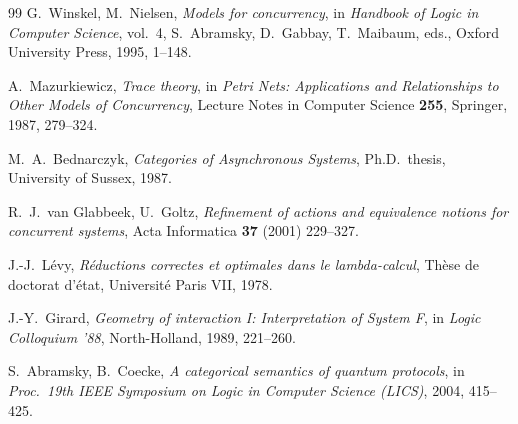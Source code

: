 \documentclass[11pt]{article}
\theoremstyle{definition}
\theoremstyle{plain}
\theoremstyle{remark}
\begin{document}
\begin{thebibliography}{99}
G.~Winskel, M.~Nielsen,
\emph{Models for concurrency},
in \textit{Handbook of Logic in Computer Science}, vol.~4,
S.~Abramsky, D.~Gabbay, T.~Maibaum, eds., Oxford University Press, 1995,
1--148.

A.~Mazurkiewicz,
\emph{Trace theory},
in \textit{Petri Nets: Applications and Relationships to Other Models of
Concurrency}, Lecture Notes in Computer Science \textbf{255},
Springer, 1987, 279--324.

M.~A.~Bednarczyk,
\emph{Categories of Asynchronous Systems},
Ph.D.\ thesis, University of Sussex, 1987.

R.~J.~van Glabbeek, U.~Goltz,
\emph{Refinement of actions and equivalence notions for concurrent
systems},
Acta Informatica \textbf{37} (2001) 229--327.

J.-J.~L\'evy,
\emph{R\'eductions correctes et optimales dans le lambda-calcul},
Th\`ese de doctorat d'\'etat, Universit\'e Paris VII, 1978.

J.-Y.~Girard,
\emph{Geometry of interaction I: Interpretation of System F},
in \textit{Logic Colloquium '88}, North-Holland, 1989, 221--260.

S.~Abramsky, B.~Coecke,
\emph{A categorical semantics of quantum protocols},
in \textit{Proc.\ 19th IEEE Symposium on Logic in Computer Science
(LICS)}, 2004, 415--425.

\end{thebibliography}
\end{document}
